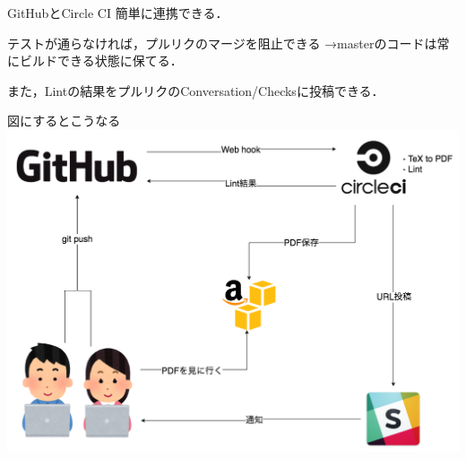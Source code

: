 \documentclass{beamer}
\begin{document}
\begin{frame}{GitHubとCircle CI}
  簡単に連携できる．

  テストが通らなければ，プルリクのマージを阻止できる
  →masterのコードは常にビルドできる状態に保てる．

  また，Lintの結果をプルリクのConversation/Checksに投稿できる．
\end{frame}

\begin{frame}{図にするとこうなる}
  \includegraphics[width=\textwidth, bb=0 0 1038 739]{img/ideal_sequence.png}
\end{frame}
\end{document}
